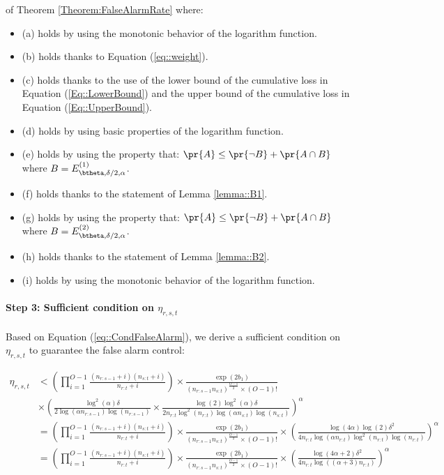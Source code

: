 \documentclass{article} %
\begin{document}
\begin{myproof}{of Theorem \ref{Theorem:FalseAlarmRate}}
where:
\begin{itemize}
\setlength\itemsep{0.25em}
    \item (a) holds by using the monotonic behavior of the logarithm function. 
    \item (b) holds thanks to Equation (\ref{eq::weight}).
    \item (c) holds thanks to the use of the lower bound of the cumulative loss in Equation (\ref{Eq::LowerBound}) and the upper bound of the cumulative loss in Equation (\ref{Eq::UpperBound}).
    \item (d) holds by using basic properties of the logarithm function.
    \item (e) holds by using the property that: $\pr{A}\leq \pr{\neg B} + \pr{A \cap B}$ where $B = E^{(1)}_{\btheta,\delta/2,\alpha}$.
    \item (f) holds thanks to the statement of Lemma \ref{lemma::B1}.
    \item (g) holds by using the property that: $\pr{A}\leq \pr{\neg B} + \pr{A \cap B}$ where $B = E^{(2)}_{\btheta,\delta/2,\alpha}$.
    \item (h) holds thanks to the statement of Lemma \ref{lemma::B2}.
    \item (i) holds by using the monotonic behavior of the logarithm function.
\end{itemize}


\paragraph{Step 3: Sufficient condition on $\eta_{r,s,t}$}

Based on Equation (\ref{eq::CondFalseAlarm}), we derive a sufficient condition on $\eta_{r,s,t}$ to guarantee the false alarm control:


\begin{align*}
	\eta_{r,s,t} &< \left( \prod_{i=1}^{O-1} \frac{\left( n_{r:s-1}+i  \right)\left( n_{s:t}+i  \right)}{n_{r:t}+i} \right) \times  \frac{\exp{(2b_1)}}{\left( n_{r:s-1} n_{s:t} \right)^{\frac{O-1}{2}} \times (O-1)! } \\
 &\times \left(\frac{\log^2(\alpha)\delta}{2\log(\alpha n_{r:s-1})\log(n_{r:s-1})} \times \frac{\log(2)\log^2(\alpha)\delta}{2n_{r:t}\log^2(n_{r:t})\log(\alpha n_{s:t})\log(n_{s:t})}\right)^\alpha \\
	& = 
\left(  \prod_{i=1}^{O-1} \frac{\left( n_{r:s-1}+i  \right)\left( n_{s:t}+i  \right)}{n_{r:t}+i} \right) \times \frac{\exp{(2b_1)}}{\left( n_{r:s-1} n_{s:t} \right)^{\frac{O-1}{2}} \times (O-1)!} 
 \times \left(\frac{\log(4\alpha)\log(2)\delta^2}{4n_{r:t}\log(\alpha n_{r:t})\log^2(n_{r:t})\log(n_{r:t})} \right)^\alpha\\
	& = \left( \prod_{i=1}^{O-1} \frac{\left( n_{r:s-1}+i  \right)\left( n_{s:t}+i  \right)}{n_{r:t}+i} \right) \times \frac{\exp{(2b_1)}}{\left( n_{r:s-1} n_{s:t} \right)^{\frac{O-1}{2}} \times (O-1)!} \times \left(\frac{\log(4\alpha+2)\delta^2}{4n_{r:t}\log(\left( \alpha+3 \right) n_{r:t})} \right)^\alpha
	\end{align*}


\end{myproof}
\end{document}
